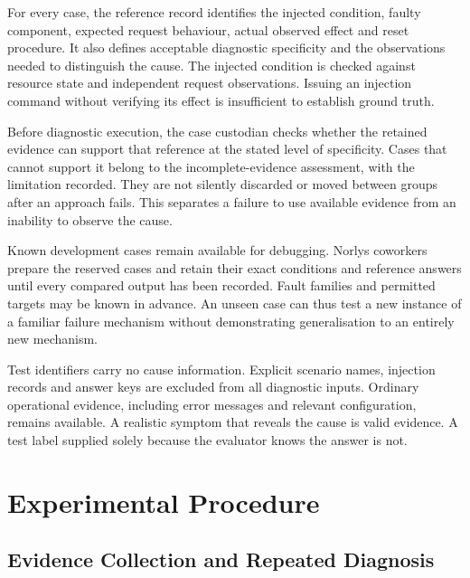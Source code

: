 For every case, the reference record identifies the injected condition,
faulty component, expected request behaviour, actual observed effect and
reset procedure. It also defines acceptable diagnostic specificity and
the observations needed to distinguish the cause. The injected condition
is checked against resource state and independent request observations.
Issuing an injection command without verifying its effect is insufficient
to establish ground truth.

Before diagnostic execution, the case custodian checks whether the retained
evidence can support that reference at the stated level of specificity.
Cases that cannot support it belong to the incomplete-evidence assessment,
with the limitation recorded. They are not silently discarded or moved
between groups after an approach fails. This separates a failure to use
available evidence from an inability to observe the cause.

Known development cases remain available for debugging. Norlys coworkers
prepare the reserved cases and retain their exact conditions and reference
answers until every compared output has been recorded. Fault families
and permitted targets may be known in advance. An unseen case can thus
test a new instance of a familiar failure mechanism without demonstrating
generalisation to an entirely new mechanism.

Test identifiers carry no cause information. Explicit scenario names,
injection records and answer keys are excluded from all diagnostic
inputs. Ordinary operational evidence, including error messages and
relevant configuration, remains available. A realistic symptom that
reveals the cause is valid evidence. A test label supplied solely because
the evaluator knows the answer is not.


\section{Experimental Procedure}
\label{sec:methodology:procedure}

\subsection{Evidence Collection and Repeated Diagnosis}

